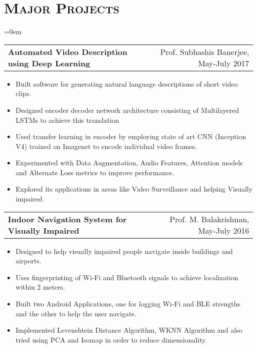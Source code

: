 \documentclass{article}
\makeatletter
\newcommand{\headerrow}[2]
{\begin{tabular*}{\linewidth}{l@{\extracolsep{\fill}}r}
    #1 &
    #2 \\
\end{tabular*}}
\newcommand{\tmpsection}[1]{}
\let\tmpsection=\section
\renewcommand{\section}[1]{\tmpsection*{\textsc{#1}}}
\makeatother
\begin{document}
\section{Major Projects}
\begin{list} {}{\leftmargin=0em}
\setlength{\leftmargin}{0pt}

    \item[]
    \headerrow {\textbf{Automated Video Description using Deep Learning}}{Prof. Subhashis Banerjee, May-July 2017}
    \begin{itemize}
    \setlength\itemsep{0.0em}
        \item Built software for generating natural language descriptions of short video clips.
		\item Designed encoder decoder network architecture consisting of Multilayered LSTMs to achieve this translation        
        \item Used transfer learning in encoder by employing state of art CNN (Inception V4) trained on Imagenet to encode individual video frames.        
        \item Experimented with Data Augmentation, Audio Features, Attention models and  Alternate Loss metrics to improve performance.
        \item Explored its applications in areas like Video Surveillance and helping Visually impaired.
    \end{itemize}
    \item[]
    \headerrow {\textbf{Indoor Navigation System for Visually Impaired}}{Prof. M. Balakrishnan, May-July 2016}
    \begin{itemize}
    \setlength\itemsep{0.0em}
        \item Designed to help visually impaired people navigate inside buildings and airports.
        \item Uses fingerprinting of Wi-Fi and Bluetooth signals to achieve localization within 2 meters.
        \item Built two Android Applications, one for logging Wi-Fi and BLE strengths and the other to help the user navigate.
        \item Implemented Levenshtein Distance Algorithm, WKNN Algorithm and also tried using  PCA and Isomap in order to reduce dimensionality.
    \end{itemize}



\end{list}
\end{document}
